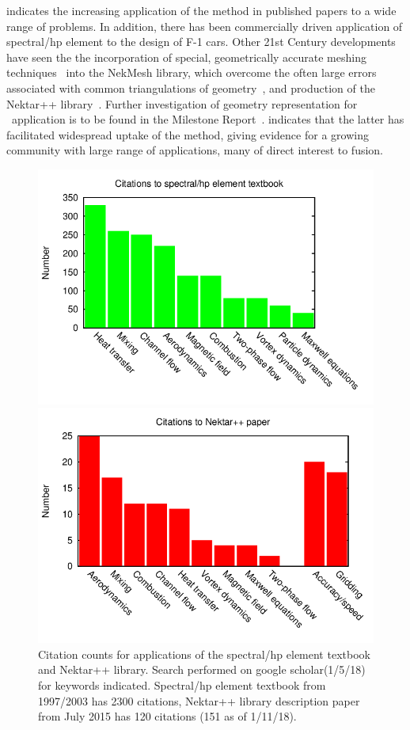 indicates the increasing application of the method in published papers to a 
wide range of problems. In addition, there has been commercially driven application of spectral/hp element
to the design of F-1 cars. Other 21st Century developments have seen the
the incorporation of special, geometrically accurate meshing techniques~\cite{Tu17fram} 
into the NekMesh library, which overcome the often large
errors associated with common triangulations of geometry~\cite{Bo12Infl}, and 
production of the Nektar++ library~\cite{Ca15Nekt}.
Further investigation of geometry representation for \nep \ application
is to be found in the Milestone Report~\cite{y1re211}.
 indicates that the latter
has facilitated widespread uptake of the method, giving evidence for a
growing community with large range of applications, many of direct interest to fusion.
\begin{figure}[h]
\centerline{\includegraphics[width=13.0cm]{../png/nektxt.png}}
\centerline{\includegraphics[width=13.0cm]{../png/nektar.png}}
\caption{
Citation counts for applications of the spectral/hp element textbook and Nektar++ library.
Search performed on google scholar(1/5/18) for keywords indicated.
Spectral/hp element textbook from 1997/2003 has 2300 citations, Nektar++ library
description paper from July 2015 has 120 citations (151 as of 1/11/18).
\label{fig:nekhist}}
\end{figure}

